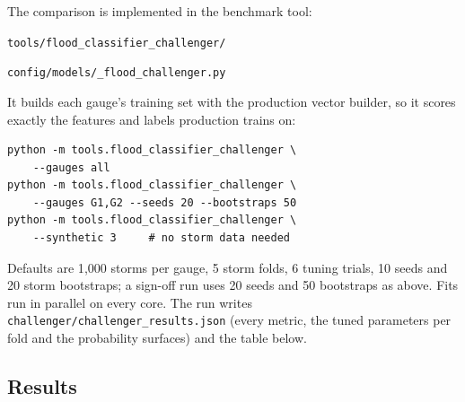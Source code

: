 \documentclass[11pt,a4paper]{article}
\begin{document}
The comparison is implemented in the benchmark tool:
\begin{description}[leftmargin=2em]
  \item[Code] \texttt{tools/flood\_classifier\_challenger/}
  \item[Settings] \texttt{config/models/\_flood\_challenger.py}
\end{description}
\noindent It builds each gauge's training set with the production
vector builder, so it scores exactly the features and labels
production trains on:

\begin{verbatim}
python -m tools.flood_classifier_challenger \
    --gauges all
python -m tools.flood_classifier_challenger \
    --gauges G1,G2 --seeds 20 --bootstraps 50
python -m tools.flood_classifier_challenger \
    --synthetic 3     # no storm data needed
\end{verbatim}

\noindent Defaults are 1{,}000 storms per gauge, 5 storm folds,
6 tuning trials, 10 seeds and 20 storm bootstraps; a sign-off run
uses 20 seeds and 50 bootstraps as above.  Fits run in parallel on
every core.  The run writes \texttt{challenger/challenger\_results.json}
(every metric, the tuned parameters per fold and the probability
surfaces) and the table below.

\subsection{Results}

\end{document}
